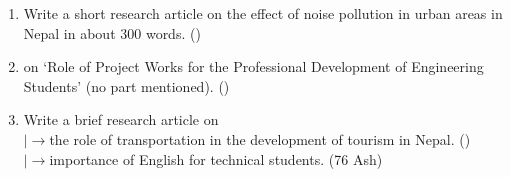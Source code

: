 \documentclass[12pt]{article}
\newcommand{\lb}{\\$\left|\rightarrow\right.$}
\begin{document}
\begin{enumerate}
\begin{enumerate}
        \item Nano Pollution and its Solution. \hfill ()

        \item Impact and Challenges of COVID-19 Pandemic and the Role of IT in Education. \hfill ()

        \item Effectiveness of virtual learning for the students of engineering. \hfill (78 Ka)
          \lb importance of Online Teaching for the Students of Engineering. \hfill ()

        \item Threat of air pollution in the urban areas in the present day Nepal in about 500 words. \hfill ()
      \end{enumerate}

    \item Write a short research article on the effect of noise pollution in urban areas in Nepal in about 300 words. \hfill ()

    \item on `Role of Project Works for the Professional Development of Engineering Students' (no part mentioned). \hfill ()

    \item Write a brief research article on 
      \lb the role of transportation in the development of tourism in Nepal. \hfill ()
      \lb importance of English for technical students. \hfill (76 Ash)
  \end{enumerate}
\end{document}
